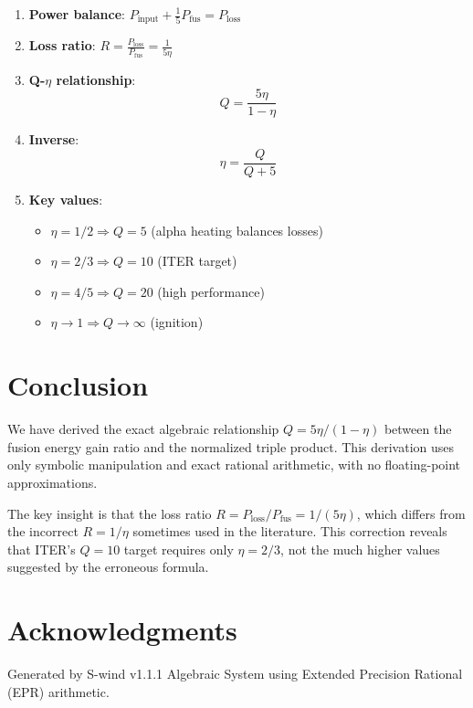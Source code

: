 \documentclass[11pt,a4paper]{article}
\begin{document}
\begin{enumerate}
    \item \textbf{Power balance}: $P_{\text{input}} + \frac{1}{5}P_{\text{fus}} = P_{\text{loss}}$
    
    \item \textbf{Loss ratio}: $R = \frac{P_{\text{loss}}}{P_{\text{fus}}} = \frac{1}{5\eta}$
    
    \item \textbf{Q-$\eta$ relationship}:
    \begin{equation}
    \boxed{Q = \frac{5\eta}{1 - \eta}}
    \end{equation}
    
    \item \textbf{Inverse}:
    \begin{equation}
    \boxed{\eta = \frac{Q}{Q + 5}}
    \end{equation}
    
    \item \textbf{Key values}:
    \begin{itemize}
        \item $\eta = 1/2 \Rightarrow Q = 5$ (alpha heating balances losses)
        \item $\eta = 2/3 \Rightarrow Q = 10$ (ITER target)
        \item $\eta = 4/5 \Rightarrow Q = 20$ (high performance)
        \item $\eta \to 1 \Rightarrow Q \to \infty$ (ignition)
    \end{itemize}
\end{enumerate}

\section{Conclusion}

We have derived the exact algebraic relationship $Q = 5\eta/(1-\eta)$ between the fusion energy gain ratio and the normalized triple product. This derivation uses only symbolic manipulation and exact rational arithmetic, with no floating-point approximations.

The key insight is that the loss ratio $R = P_{\text{loss}}/P_{\text{fus}} = 1/(5\eta)$, which differs from the incorrect $R = 1/\eta$ sometimes used in the literature. This correction reveals that ITER's $Q = 10$ target requires only $\eta = 2/3$, not the much higher values suggested by the erroneous formula.

\section*{Acknowledgments}
Generated by S-wind v1.1.1 Algebraic System using Extended Precision Rational (EPR) arithmetic.
\end{document}
